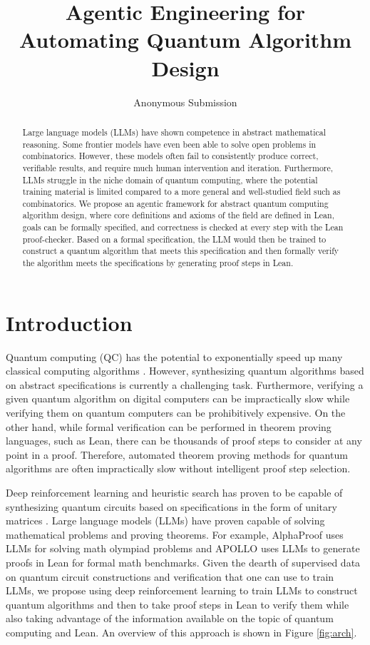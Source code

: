 \documentclass[letterpaper]{article} %
\title{Agentic Engineering for Automating Quantum Algorithm Design}
\author{Anonymous Submission}
\begin{document}
\maketitle

\begin{abstract}
Large language models (LLMs) have shown competence in abstract mathematical reasoning.
Some frontier models have even been able to solve open problems in combinatorics.
However, these models often fail to consistently produce correct, verifiable results, and require
much human intervention and iteration.
Furthermore, LLMs struggle in the niche domain of quantum computing, where the potential training material is
limited compared to a more general and well-studied field such as combinatorics.
We propose an agentic framework for abstract quantum computing algorithm design,
where core definitions and axioms of the field are defined in Lean, goals can be formally specified, and correctness is checked at every step with the Lean proof-checker. Based on a formal specification, the LLM would then be trained to construct a quantum algorithm that meets this specification and then formally verify the algorithm meets the specifications by generating proof steps in Lean.
\end{abstract}

\section{Introduction}

Quantum computing (QC) has the potential to exponentially speed up
many classical computing algorithms \cite{brandao2010exponential}. 
However, synthesizing quantum algorithms based on abstract specifications is currently a challenging task.
Furthermore, verifying a given quantum algorithm on digital computers can be impractically slow while verifying them on quantum computers can be prohibitively expensive.
On the other hand, while formal verification can be performed in theorem proving languages, such as Lean, there can be thousands of proof steps to consider at any point in a proof. Therefore, automated theorem proving methods for quantum algorithms are often impractically slow without intelligent proof step selection.

Deep reinforcement learning and heuristic search has proven to be capable of synthesizing quantum circuits based on specifications in the form of unitary matrices \cite{zhang2020topological,bao2024twisty,turner2025quantum}. Large language models (LLMs) have proven capable of solving mathematical problems and proving theorems. For example, AlphaProof \cite{hubert2025olympiad} uses LLMs for solving math olympiad problems and APOLLO \cite{ospanov2026apollo} uses LLMs to generate proofs in Lean for formal math benchmarks. Given the dearth of supervised data on quantum circuit constructions and verification that one can use to train LLMs, we propose using deep reinforcement learning to train LLMs to construct quantum algorithms and then to take proof steps in Lean to verify them while also taking advantage of the information available on the topic of quantum computing and Lean. An overview of this approach is shown in Figure \ref{fig:arch}.
\end{document}
